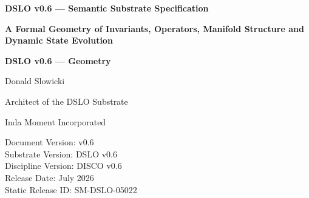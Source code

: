 \documentclass[11pt]{article}
\begin{document}
\begin{titlepage}
\centering

{\Large\bfseries DSLO v0.6 --- Semantic Substrate Specification\par}
\vspace{2em}
{\large\bfseries A Formal Geometry of Invariants, Operators, Manifold Structure and Dynamic State Evolution\par}
\vspace{1em}

{\Large\bfseries DSLO v0.6 --- Geometry\par}




\vspace{2em}
{\large Donald Slowicki\par}
{\small Architect of the DSLO Substrate\par}
{\small Inda Moment Incorporated\par}


\vfill

{\small
Document Version: v0.6\\
Substrate Version: DSLO v0.6\\
Discipline Version: DISCO v0.6\\
Release Date: July 2026\\
Static Release ID: SM-DSLO-05022\\
}

\vspace{2em}

\end{titlepage}
\end{document}
